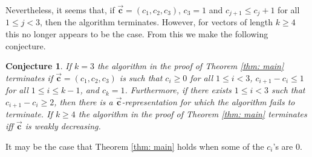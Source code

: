 \documentclass[]{interact}
\newcommand{\vtr}[1]{\vec{\mathbf{#1}}}
\theoremstyle{plain}
\numberwithin{equation}{section} %
\newtheorem{conjecture}[thm]{Conjecture}
\numberwithin{table}{section} %
\numberwithin{figure}{section}
\begin{document}
Nevertheless, it seems that, if $\vtr{c} = (c_1, c_2 ,c_3)$, $c_3 = 1$ and $c_{j+1} \leq c_j + 1$ for all $1\leq j < 3$, then the algorithm terminates. However, for vectors of length $k\geq 4$ this no longer appears to be the case. From this we make the following conjecture. 

\begin{conjecture}\label{con: alg term}
    If $k=3$ the algorithm in the proof of Theorem \textcolor{blue}{\ref{thm: main}} terminates if $\vtr{c}=(c_1,c_2,c_3)$ is such that $c_i\geq 0$ for all $1\leq i< 3$, $c_{i+1}-c_{i}\leq 1$ for all $1\leq i\leq k-1$, and $c_k=1$. Furthermore, if there exists $1\leq i<3$ such that $c_{i+1}-c_i\geq 2$, then there is a $\vtr{c}$-representation for which the algorithm fails to terminate. If $k\geq 4$ the algorithm in the proof of Theorem \textcolor{blue}{\ref{thm: main}} terminates iff $\vtr{c}$ is weakly decreasing.
\end{conjecture} 

It may be the case that Theorem \textcolor{blue}{\ref{thm: main}} holds when some of the $c_i$'s are 0.
\end{document}
